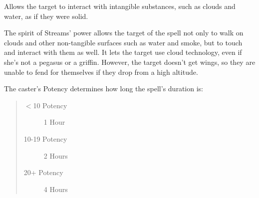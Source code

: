 \documentclass[11pt,a4paper,twocolumn]{book}
\begin{document}
\medskip

Allows the target to interact with intangible substances, such as clouds and water, as if they were solid.

The spirit of Streams' power allows the target of the spell not only to walk on clouds and other non-tangible surfaces such as water and smoke, but to touch and interact with them as well. It lets the target use cloud technology, even if she's not a pegasus or a griffin. However, the target doesn't get wings, so they are unable to fend for themselves if they drop from a high altitude.

The caster's Potency determines how long the spell's duration is:

\begin{quote}
	\begin{description}
		\item[$<$10 Potency] 	1 Hour
		\item[10-19 Potency] 	2 Hours
		\item[20+ Potency] 		4 Hours
	\end{description}	
\end{quote}

%	
%
%
%

\end{document}
